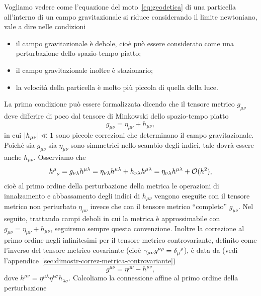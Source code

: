 Vogliamo vedere come l'equazione del moto~\eqref{eq:geodetica} di una particella
all'interno di un campo gravitazionale si riduce considerando il limite
newtoniano, vale a dire nelle condizioni
\begin{itemize}
\item il campo gravitazionale è debole, cioè può essere considerato come una
  perturbazione dello spazio-tempo piatto;
\item il campo gravitazionale inoltre è stazionario;
\item la velocità della particella è molto più piccola di quella della luce.
\end{itemize}
La prima condizione può essere formalizzata dicendo che il
tensore metrico $g_{\mu\nu}$ deve differire di poco dal
tensore di Minkowski dello spazio-tempo piatto
\begin{equation}
  g_{\mu\nu} = \eta_{\mu\nu} + h_{\mu\nu},
\end{equation}
in cui $\lvert h_{\mu\nu}\rvert \ll 1$ sono piccole correzioni che determinano il campo
gravitazionale.  Poiché sia $g_{\mu\nu}$ sia $\eta_{\mu\nu}$ sono simmetrici
nello scambio degli indici, tale dovrà essere anche $h_{\mu\nu}$.  Osserviamo
che
\begin{equation}
  \tensor{h}{^{\mu}_{\nu}} = g_{\nu\lambda}h^{\mu\lambda} =
  \eta_{\nu\lambda}h^{\mu\lambda} + h_{\nu\lambda}h^{\mu\lambda} =
  \eta_{\nu\lambda}h^{\mu\lambda} + \mathcal{O}(h^{2}),
\end{equation}
cioè al primo ordine della perturbazione della metrica le operazioni di
innalzamento e abbassamento degli indici di $h_{\mu\nu}$ vengono eseguite con il
tensore metrico non perturbato $\eta_{\mu\nu}$ invece che con il tensore metrico
``completo'' $g_{\mu\nu}$.  Nel seguito, trattando campi deboli in cui la
metrica è approssimabile con $g_{\mu\nu} = \eta_{\mu\nu} + h_{\mu\nu}$,
seguiremo sempre questa convenzione.  Inoltre la correzione al primo ordine
negli infinitesimi per il tensore metrico controvariante, definito come
l'inverso del tensore metrico covariante (cioè $\gamma_{\mu\nu}g^{\nu\rho} =
\tensor{\delta}{_{\mu}^{\rho}}$), è data da (vedi
l'appendice~\ref{sec:dimostr-correz-metrica-controvariante})
\begin{equation}
  \label{eq:correzione-metrica-controvariante}
  g^{\mu\nu} = \eta^{\mu\nu} - h^{\mu\nu},
\end{equation}
dove $h^{\mu\nu} = \eta^{\mu\lambda}\eta^{\nu\sigma} h_{\lambda\sigma}$.
Calcoliamo la connessione affine al primo ordine della perturbazione
